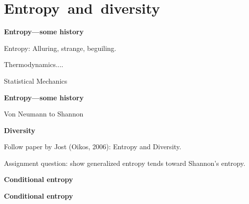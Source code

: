 \section{Entropy\ and\ diversity}

\textbf{Entropy---some history}

Entropy: Alluring, strange, beguiling.

Thermodynamics....

Statistical Mechanics







\textbf{Entropy---some history}

Von Neumann to Shannon



\textbf{Diversity}






  
   
    Follow paper by Jost (Oikos, 2006):
    Entropy and Diversity\cite{jost2006a}.
  




  Assignment question: show generalized entropy tends
  toward Shannon's entropy.

  \textbf{Conditional entropy}
  

  \textbf{Conditional entropy}
  
